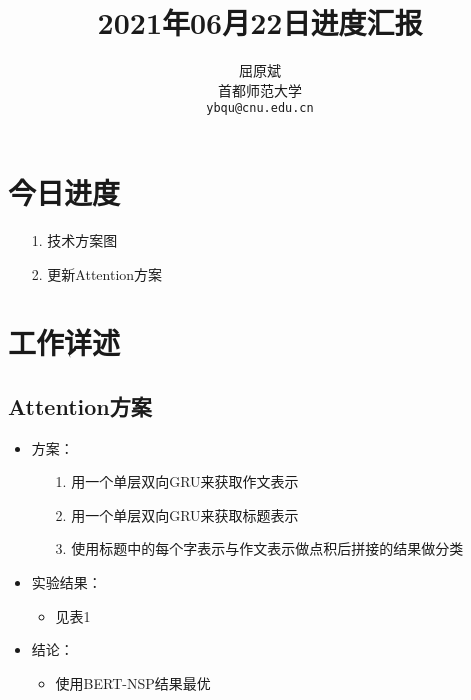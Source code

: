 \documentclass[11pt]{article}
\title{2021年06月22日进度汇报}
\author{屈原斌 \\
  首都师范大学 \\
    {\tt ybqu@cnu.edu.cn}}
\date{}
\begin{document}
\begin{CJK}{UTF8}{gkai}

\maketitle
\CJKindent


\section{今日进度}


\begin{itemize}
  \item [1.] 技术方案图
  \item [2.] 更新Attention方案
\end{itemize}

\section{工作详述}
\subsection{Attention方案}
\begin{itemize}
  \item 方案：
  \begin{itemize}
    \item [1.] 用一个单层双向GRU来获取作文表示
    \item [2.] 用一个单层双向GRU来获取标题表示
    \item [3.] 使用标题中的每个字表示与作文表示做点积后拼接的结果做分类
  \end{itemize}
  \item 实验结果：
  \begin{itemize}
    \item 见表1
  \end{itemize}
  \item 结论：
  \begin{itemize}
    \item 使用BERT-NSP结果最优
  \end{itemize}
\end{itemize}


\end{CJK}
\end{document}
